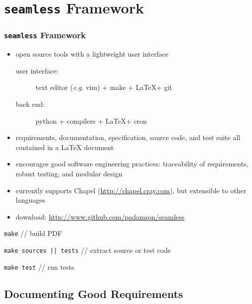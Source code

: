 \documentclass{beamer}
\makeatletter
\newcommand*{\eg}{\emph{e.g.}\@\xspace}
\newcommand*{\seamless}{\texttt{seamless}\@\xspace}
\newcommand*{\latex}{\LaTeX\@\xspace}
\makeatother
\begin{document}
\section{\seamless Framework}
\begin{frame}
  \frametitle{\seamless Framework}
  \begin{itemize}
    \item open source tools with a lightweight user interface
      \begin{description}
        \item[user interface:] text editor (\eg vim) + make + \latex + git
        \item[back end:] python + compilers + \latex + cron
      \end{description}
    \item requirements, documentation, specification, source code, and test suite all contained in 
      a \latex document
    \item encourages good software engineering practices: traceability of requirements, robust
      testing, and modular design 
    \item currently supports Chapel (\url{http://chapel.cray.com}), but extensible to other languages
    \item download: \url{http://www.github.com/padamson/seamless}
  \end{itemize}
      \begin{beamerbox}
        \item \texttt{make} // build PDF
        \item \texttt{make sources || tests} // extract source or test code
        \item \texttt{make test} // run tests
      \end{beamerbox}
\end{frame}

\subsection{Documenting Good Requirements}
\end{document}
